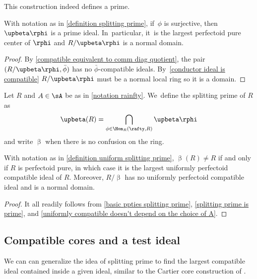 This construction indeed defines a prime.

\begin{corollary}\label{splitting prime is prime}
With notation as in \autoref{definition splitting prime}, if~$\phi$ is surjective, then $\upbeta\rphi$ is a prime ideal. In~particular, it~is the largest perfectoid pure center of $\rphi$ and $R/\upbeta\rphi$ is a normal domain.
\end{corollary}

\begin{proof}
By \autoref{compatible equivalent to comm diag quotient}, the pair $(R/\upbeta\rphi, \bar{\phi})$ has no $\bar{\phi}$-compatible ideals. By~\autoref{conductor ideal is compatible} $R/\upbeta\rphi$ must be a normal local ring so it is a domain.
\end{proof}

\begin{definition}\label{definition uniform splitting prime}
Let $R$ and $A\in\sA$ be as in \autoref{notation rainfty}. We~define the splitting prime of $R$ as
\[
\upbeta(R)=\bigcap_{\phi\in \Hom_R\left(\rafty,R\right)}\upbeta\rphi
\]
and write $\upbeta$ when there is no confusion on the ring.
\end{definition}

\begin{proposition}\label{basic properties uniform splitting prime}
With notation as in \autoref{definition uniform splitting prime}, $\upbeta(R)\neq R$ if and only if $R$ is perfectoid pure, in which case it is the largest uniformly perfectoid compatible ideal of $R$. Moreover, $R/\upbeta$ has no uniformly perfectoid compatible ideal and is a normal domain.
\end{proposition}

\begin{proof}
It all readily follows from \autoref{basic ppties splitting prime}, \autoref{splitting prime is prime}, and \autoref{uniformly compatible doesn't depend on the choice of A}.
\end{proof}

\subsection{Compatible cores and a test ideal}\label{section compatible cores}
We can can generalize the idea of splitting prime to find the largest compatible ideal contained inside a given ideal, similar to the Cartier core construction of \cite{BadillaCespedesFInvariantsSRRings,BrosowskyCartierCoreMap,CarvajalFayolleTameRamificationCFPS}.

